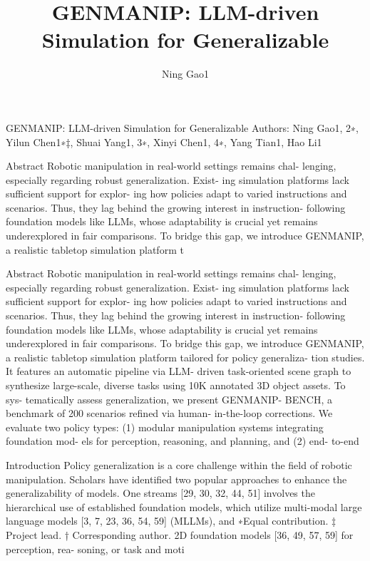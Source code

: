 \documentclass{beamer}
\title{GENMANIP: LLM-driven Simulation for Generalizable}
\author{Ning Gao1}
\date{}
\begin{document}
\frame{\titlepage}

\begin{frame}{GENMANIP: LLM-driven Simulation for Generalizable}
Authors: Ning Gao1, 2∗, Yilun Chen1∗‡, Shuai Yang1, 3∗, Xinyi Chen1, 4∗, Yang Tian1, Hao Li1
\end{frame}

\begin{frame}{Abstract}
Robotic manipulation in real-world settings remains chal-
lenging, especially regarding robust generalization. Exist-
ing simulation platforms lack sufficient support for explor-
ing how policies adapt to varied instructions and scenarios.
Thus, they lag behind the growing interest in instruction-
following foundation models like LLMs, whose adaptability
is crucial yet remains underexplored in fair comparisons.
To bridge this gap, we introduce GENMANIP, a realistic
tabletop simulation platform t
\end{frame}

\begin{frame}{Abstract}
Robotic manipulation in real-world settings remains chal-
lenging, especially regarding robust generalization. Exist-
ing simulation platforms lack sufficient support for explor-
ing how policies adapt to varied instructions and scenarios.
Thus, they lag behind the growing interest in instruction-
following foundation models like LLMs, whose adaptability
is crucial yet remains underexplored in fair comparisons.
To bridge this gap, we introduce GENMANIP, a realistic
tabletop simulation platform tailored for policy generaliza-
tion studies. It features an automatic pipeline via LLM-
driven task-oriented scene graph to synthesize large-scale,
diverse tasks using 10K annotated 3D object assets. To sys-
tematically assess generalization, we present GENMANIP-
BENCH, a benchmark of 200 scenarios refined via human-
in-the-loop corrections. We evaluate two policy types: (1)
modular manipulation systems integrating foundation mod-
els for perception, reasoning, and planning, and (2) end-
to-end 
\end{frame}

\begin{frame}{Introduction}
Policy generalization is a core challenge within the field of
robotic manipulation. Scholars have identified two popular
approaches to enhance the generalizability of models. One
streams [29, 30, 32, 44, 51] involves the hierarchical use of
established foundation models, which utilize multi-modal
large language models [3, 7, 23, 36, 54, 59] (MLLMs), and
∗Equal contribution.
‡ Project lead.
† Corresponding author.
2D foundation models [36, 49, 57, 59] for perception, rea-
soning, or task and moti
\end{frame}
\end{document}
